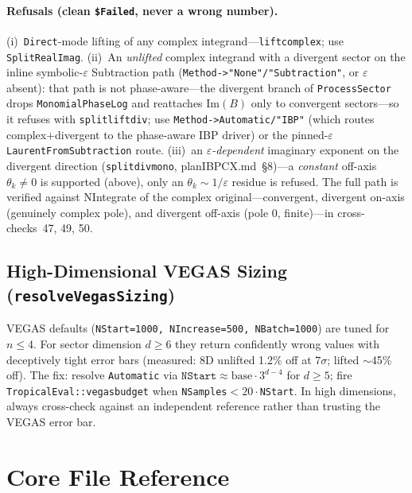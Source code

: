 \documentclass[11pt,a4paper]{article}
\begin{document}
\paragraph{Refusals (clean \texttt{\$Failed}, never a wrong number).} (i)~\texttt{Direct}-mode lifting of any complex integrand---\texttt{liftcomplex}; use \texttt{SplitRealImag}. (ii)~An \emph{unlifted} complex integrand with a divergent sector on the inline symbolic-$\varepsilon$ Subtraction path (\texttt{Method->"None"/"Subtraction"}, or $\varepsilon$ absent): that path is not phase-aware---the divergent branch of \texttt{ProcessSector} drops \texttt{MonomialPhaseLog} and reattaches $\mathrm{Im}(B)$ only to convergent sectors---so it refuses with \texttt{splitliftdiv}; use \texttt{Method->Automatic/"IBP"} (which routes complex$+$divergent to the phase-aware IBP driver) or the pinned-$\varepsilon$ \texttt{LaurentFromSubtraction} route. (iii)~an \emph{$\varepsilon$-dependent} imaginary exponent on the divergent direction (\texttt{splitdivmono}, planIBPCX.md~\S8)---a \emph{constant} off-axis $\theta_k\neq 0$ is supported (above), only an $\theta_k\sim1/\varepsilon$ residue is refused. The full path is verified against NIntegrate of the complex original---convergent, divergent on-axis (genuinely complex pole), and divergent off-axis (pole $0$, finite)---in cross-checks~47, 49, 50.

\subsection{High-Dimensional VEGAS Sizing (\texttt{resolveVegasSizing})}\label{sec:vegassizing}

VEGAS defaults (\texttt{NStart=1000, NIncrease=500, NBatch=1000}) are tuned for $n\leq 4$. For sector dimension $d\geq 6$ they return confidently wrong values with deceptively tight error bars (measured: 8D unlifted 1.2\% off at $7\sigma$; lifted $\sim$45\% off). The fix: resolve \texttt{Automatic} via $\texttt{NStart}\approx\text{base}\cdot 3^{d-4}$ for $d\geq 5$; fire \texttt{TropicalEval::vegasbudget} when \texttt{NSamples}$<20\cdot$\texttt{NStart}. In high dimensions, always cross-check against an independent reference rather than trusting the VEGAS error bar.

\section{Core File Reference}
\end{document}
